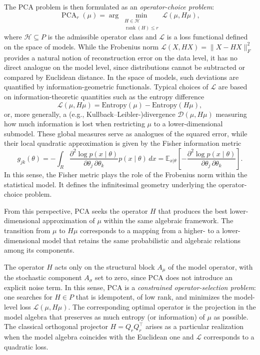 The PCA problem is then formulated as an \emph{operator-choice problem}:
\begin{equation}
\label{eq:model-pca}
\operatorname{PCA}_r(\mu)
    = \arg\min_{\substack{H \in \mathcal{H} \\ \operatorname{rank}(H) \le r}}
    \mathcal{L}(\mu, H\mu),
\end{equation}
where $\mathcal{H} \subseteq P$ is the admissible operator class and $\mathcal{L}$ is a loss functional defined on the space of models. While the Frobenius norm $\mathcal{L}(X,HX)=\|X - HX\|_F^2$ provides a natural notion of reconstruction error on the data level, it has no direct analogue on the model level, since distributions cannot be subtracted or compared by Euclidean distance. In the space of models, such deviations are quantified by information-geometric functionals. Typical choices of $\mathcal{L}$ are based on information-theoretic quantities such as the entropy difference
\[
    \mathcal{L}(\mu, H\mu)
        = \mathrm{Entropy}(\mu) - \mathrm{Entropy}(H\mu),
\]
or, more generally, a (e.g., Kullback–Leibler-)divergence $\mathcal{D}(\mu, H\mu)$ measuring how much information is lost when restricting $\mu$ to a lower-dimensional submodel. These global measures serve as analogues of the squared error, while their local quadratic approximation is given by the Fisher information metric
\[
{\displaystyle g_{jk}(\theta )=-\int _{R}{\frac {\partial ^{2}\log p(x\mid \theta )}{\partial \theta _{j}\,\partial \theta _{k}}}p(x\mid \theta )\,dx=\mathbb {E} _{x|\theta }\left[-{\frac {\partial ^{2}\log p(x\mid \theta )}{\partial \theta _{j}\,\partial \theta _{k}}}\right].}
\]
In this sense, the Fisher metric plays the role of the Frobenius norm within the statistical model. It defines the infinitesimal geometry underlying the operator-choice problem. 

From this perspective, PCA seeks the operator $H$ that produces the best lower-dimensional approximation of $\mu$ within the same algebraic framework. The transition from $\mu$ to $H\mu$ corresponds to a mapping from a higher- to a lower-dimensional model that retains the same probabilistic and algebraic relations among its components.

The operator $H$ acts only on the structural block $A_\mu$ of the model operator, with the stochastic component $A_\sigma$ set to zero, since PCA does not introduce an explicit noise term. In this sense, PCA is a \emph{constrained operator-selection problem}: one searches for $H \in P$ that is idempotent, of low rank, and minimizes the model-level loss $\mathcal{L}(\mu,H\mu)$. The corresponding optimal operator is the projection in the model algebra that preserves as much entropy (or information) of $\mu$ as possible. The classical orthogonal projector $H = Q_r Q_r^\top$ arises as a particular realization when the model algebra coincides with the Euclidean one and $\mathcal{L}$ corresponds to a quadratic loss.

